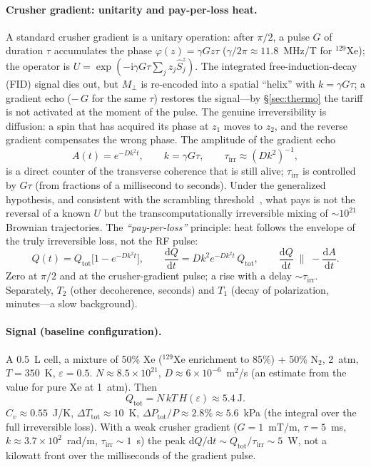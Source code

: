 \documentclass[11pt,a4paper]{article}
\newcommand{\Sref}[1]{\hyperref[#1]{\S\ref{#1}}}
\begin{document}
\paragraph{Crusher gradient: unitarity and pay-per-loss heat.}
A standard crusher gradient is a unitary operation: after $\pi/2$, a pulse $G$ of duration $\tau$ accumulates the phase $\varphi(z)=\gamma G z\tau$ ($\gamma/2\pi \approx 11.8$~MHz/T for $^{129}$Xe); the operator is $U=\exp(-\mathrm{i}\gamma G\tau\sum_j z_j\hat S_j^z)$. The integrated free-induction-decay (FID) signal dies out, but $M_\perp$ is re-encoded into a spatial ``helix'' with $k=\gamma G\tau$; a gradient echo ($-\,G$ for the same $\tau$) restores the signal---by \Sref{sec:thermo} the tariff is not activated at the moment of the pulse. The genuine irreversibility is diffusion: a spin that has acquired its phase at $z_1$ moves to $z_2$, and the reverse gradient compensates the wrong phase. The amplitude of the gradient echo
\begin{equation}
A(t)=e^{-Dk^2 t}, \qquad k=\gamma G\tau, \qquad \tau_{\mathrm{irr}}\approx (Dk^2)^{-1},
\end{equation}
is a direct counter of the transverse coherence that is still alive; $\tau_{\mathrm{irr}}$ is controlled by $G\tau$ (from fractions of a millisecond to seconds). Under the generalized hypothesis, and consistent with the scrambling threshold~\cite{ponfilenok2026threshold}, what pays is not the reversal of a known $U$ but the transcomputationally irreversible mixing of $\sim 10^{21}$ Brownian trajectories. The \emph{``pay-per-loss''} principle: heat follows the envelope of the truly irreversible loss, not the RF pulse:
\begin{equation}
Q(t)=Q_{\mathrm{tot}}\bigl[1-e^{-Dk^2 t}\bigr], \qquad
\frac{\mathrm{d} Q}{\mathrm{d} t}=Dk^2 e^{-Dk^2 t}\,Q_{\mathrm{tot}}, \qquad
\frac{\mathrm{d} Q}{\mathrm{d} t}\;\parallel\;-\frac{\mathrm{d} A}{\mathrm{d} t}.
\end{equation}
Zero at $\pi/2$ and at the crusher-gradient pulse; a rise with a delay $\sim\tau_{\mathrm{irr}}$. Separately, $T_2$ (other decoherence, seconds) and $T_1$ (decay of polarization, minutes---a slow background).

\paragraph{Signal (baseline configuration).}
A 0.5~L cell, a mixture of 50\% Xe ($^{129}$Xe enrichment to 85\%) + 50\% N$_2$, 2~atm, $T = 350$~K, $\varepsilon = 0.5$. $N \approx 8.5 \times 10^{21}$, $D\approx 6\times 10^{-6}$~m$^2$/s (an estimate from the value for pure Xe at 1~atm). Then
\begin{equation}
Q_{\mathrm{tot}} = N\, k T\, H(\varepsilon) \approx 5.4~\text{J}.
\end{equation}
$C_v \approx 0.55$~J/K, $\Delta T_{\mathrm{tot}}\approx 10$~K, $\Delta P_{\mathrm{tot}}/P \approx 2.8\% \approx 5.6$~kPa (the integral over the full irreversible loss). With a weak crusher gradient ($G=1$~mT/m, $\tau=5$~ms, $k\approx 3.7\times 10^2$~rad/m, $\tau_{\mathrm{irr}}\sim 1$~s) the peak $\mathrm{d} Q/\mathrm{d} t\sim Q_{\mathrm{tot}}/\tau_{\mathrm{irr}}\sim 5$~W, not a kilowatt front over the milliseconds of the gradient pulse.
\end{document}
